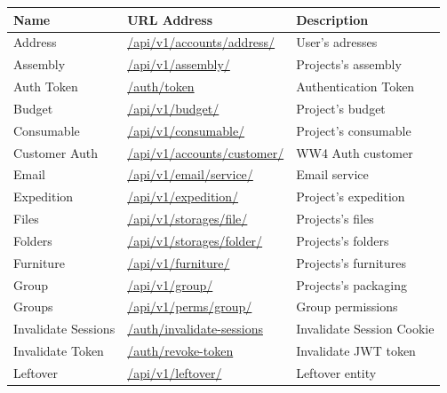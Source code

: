 \begin{table}[!h]
\centering
\begin{tabular}{l l l }
\hline
\textbf{Name} & \textbf{URL Address} & \textbf{Description} \\
\hline
Address & \href{http://193.136.195.25/ww4/api/v1/accounts/address/}{/api/v1/accounts/address/} & User's adresses\\
Assembly & \href{http://193.136.195.25/ww4/api/v1/assembly/}{/api/v1/assembly/} & Projects's assembly \\
Auth Token & \href{http://193.136.195.25/ww4/auth/token}{/auth/token} &  Authentication Token\\
Budget & \href{http://193.136.195.25/ww4/api/v1/budget/}{/api/v1/budget/} & Project's budget \\
Consumable & \href{http://193.136.195.25/ww4/api/v1/consumable/}{/api/v1/consumable/} & Project's consumable \\
Customer Auth & \href{http://193.136.195.25/ww4/api/v1/accounts/customer/}{/api/v1/accounts/customer/} & WW4 Auth customer \\
Email  & \href{http://193.136.195.25/ww4/api/v1/email/service/}{/api/v1/email/service/} & Email service \\
Expedition & \href{http://193.136.195.25/ww4/api/v1/expedition/}{/api/v1/expedition/} & Project's expedition\\
Files & \href{http://193.136.195.25/ww4/api/v1/storages/file/}{/api/v1/storages/file/} & Projects's files \\
Folders & \href{http://193.136.195.25/ww4/api/v1/storages/folder/}{/api/v1/storages/folder/} & Projects's folders \\
Furniture & \href{http://193.136.195.25/ww4/api/v1/furniture/}{/api/v1/furniture/} & Projects's furnitures \\
Group & \href{http://193.136.195.25/ww4/api/v1/group/}{/api/v1/group/} & Projects's packaging\\
Groups  & \href{http://193.136.195.25/ww4/api/v1/perms/group/}{/api/v1/perms/group/} & Group permissions \\
Invalidate Sessions & \href{http://193.136.195.25/ww4/auth/invalidate-sessions}{/auth/invalidate-sessions} & Invalidate Session Cookie \\
Invalidate Token & \href{http://193.136.195.25/ww4/auth/revoke-token}{/auth/revoke-token} &  Invalidate JWT token \\
Leftover & \href{http://193.136.195.25/ww4/api/v1/leftover/}{/api/v1/leftover/} & Leftover entity \\

\end{tabular}
\end{table}
